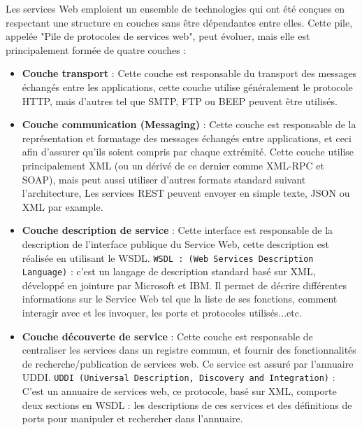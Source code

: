 Les services Web emploient un ensemble de technologies qui ont été conçues en respectant une structure en couches sans être dépendantes entre elles. Cette pile, appelée "Pile de protocoles de services web", peut évoluer, mais elle est principalement formée de quatre couches : \cite{refTutorialPointsWS}
\begin{itemize}
	\item \textbf{Couche transport} : Cette couche est responsable du transport des messages échangés entre les applications, cette couche utilise généralement le protocole HTTP, mais d'autres tel que SMTP, FTP ou BEEP peuvent être utilisés.
	\item \textbf{Couche communication (Messaging)} : Cette couche est responsable de la représentation et formatage des messages échangés entre applications, et ceci afin d'assurer qu'ils soient compris par chaque extrémité. Cette couche utilise principalement XML (ou un dérivé de ce dernier comme XML-RPC et SOAP), mais peut aussi utiliser d'autres formats standard suivant l'architecture, Les services REST peuvent envoyer en simple texte, JSON ou XML par example.
	\item \textbf{Couche description de service} : Cette interface est responsable de la description de l'interface publique du Service Web, cette description est réalisée en utilisant le WSDL.\newline
	      \texttt{WSDL : (Web Services Description Language)} : c'est un langage de description standard basé sur XML, développé en jointure par Microsoft et IBM. Il permet de décrire différentes informations sur le Service Web tel que la liste de ses fonctions, comment interagir avec et les invoquer, les ports et protocoles utilisés...etc.
	\item \textbf{Couche découverte de service} : Cette couche est responsable de centraliser les services dans un registre commun, et fournir des fonctionnalités de recherche/publication de services web. Ce service est assuré par l'annuaire UDDI.\newline
	      \texttt{UDDI (Universal Description, Discovery and Integration)} : C'est un annuaire de services web, ce protocole, basé sur XML, comporte deux sections en WSDL : les descriptions de ces services et des définitions de ports pour manipuler et rechercher dans l'annuaire.
\end{itemize}
			

